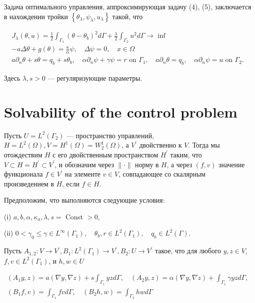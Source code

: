 \documentclass[10pt]{article}
\begin{document}
Задача оптимального управления, аппроксимирующая задачу (4), (5),
заключается в нахождении тройки $\left\{\theta_{\lambda}, \psi_{\lambda}, u_{\lambda}\right\}$
такой, что

\[
\begin{gathered}
J_{\lambda}(\theta, u)=\frac{1}{2} \int_{\Gamma_{1}}\left(\theta-\theta_{b}\right)^{2} d
\Gamma+\frac{\lambda}{2} \int_{\Gamma_{2}} u^{2} d \Gamma \rightarrow \text{ inf } \\
-a \Delta \theta+g(\theta)=\frac{\kappa}{\alpha} \psi, \quad \Delta \psi=0, \quad x \in \Omega \\
a \partial_{n} \theta+s \theta=q_{b}+s \theta_{b},
\quad \alpha \partial_{n} \psi+\gamma \psi=r \text{ on } \Gamma_{1},
\quad a \partial_{n} \theta=q_{b}, \quad \alpha \partial_{n} \psi=u \text{ on } \Gamma_{2}.
\end{gathered}
\]


Здесь $\lambda, s>0$ — регуляризующие параметры.

\section{Solvability of the control problem}
Пусть $U=L^{2}\left(\Gamma_{2}\right)$ — пространство управлений,
$H=L^{2}(\Omega), V=H^{1}(\Omega )=W_{2}^{1}(\Omega)$, а $V^{\prime}$ двойственно к $V$.
Тогда мы отождествим $H$ с его двойственным пространством $H^{\prime}$ таким,
что $V \subset H=H^{\prime} \subset V^{\prime}$, и обозначим через $\|\cdot \|$ норму в $H$,
а через $(f, v)$ значение функционала $f \in V^{\prime}$ на элементе $v \in V$,
совпадающее со скалярным произведением в $ H$, если $f \in H$.


Предположим, что выполняются следующие условия:

(i) $a, b, \alpha, \kappa_{a}, \lambda, s=$ Const $>0$,

(ii) $0<\gamma_{0} \leq \gamma \in L^{\infty}\left(\Gamma_{1}\right), \quad \theta_{b},
 r \in L^{2}\left(\Gamma_{1}\right), \quad q_{b} \in L^{2}(\Gamma)$.

Пусть $A_{1,2}: V \rightarrow V^{\prime}, B_{1}: L^{2}\left(\Gamma_{1}\right) \rightarrow V^{\prime},
B_{2}: U \rightarrow V^{\prime}$ такое, что для любого
$y, z \in V$, $f, v \in L^{2}\left(\Gamma_{1}\right)$, и $h, w \in U$

\[
\begin{gathered}
\left(A_{1} y, z\right)=a(\nabla y, \nabla z)+s \int_{\Gamma_{1}} y z d \Gamma,
\quad\left(A_{2} y, z\right)=\alpha(\nabla y, \nabla z)+\int_{\Gamma_{1}} \gamma y z d \Gamma, \\
\left(B_{1} f, v\right)=\int_{\Gamma_{1}} f v d \Gamma, \quad\left(B_{2} h, w\right)=\int_{\Gamma_{2}} h w d \Gamma
\end{gathered}
\]
\end{document}
